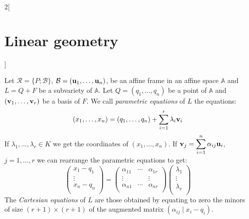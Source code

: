 \documentclass[../../../main.tex]{subfiles}
\begin{document}
\begin{multicols}{2}[\section{Linear geometry}]
\begin{definition}
  \end{definition}
  \begin{definition}
    Let $\mathcal{R}=\{P;\mathcal{B}\}$, $\mathcal{B}=(\boldsymbol{\mathrm{u}}_1,\ldots,\boldsymbol{\mathrm{u}}_n)$, be an affine frame in an affine space $\mathbb{A}$ and $L=Q+F$ be a subvariety of $\mathbb{A}$. Let $Q=(q_1,\ldots,q_n)$ be a point of $\mathbb{A}$ and $(\boldsymbol{\mathrm{v}}_1,\ldots,\boldsymbol{\mathrm{v}}_r)$ be a basis of $F$. We call \emph{parametric equations} of $L$ the equations: $$(x_1,\ldots,x_n)=(q_1,\ldots,q_n)+\sum_{i=1}^r\lambda_i\boldsymbol{\mathrm{v}}_i$$ If $\lambda_1,\ldots,\lambda_r\in K$ we get the coordinates of $(x_1,\ldots,x_n)$. If $\displaystyle \boldsymbol{\mathrm{v}}_j=\sum_{i=1}^n\alpha_{ij}\boldsymbol{\mathrm{u}}_i$, $j=1,\ldots,r$ we can rearrange the parametric equations to get: $$\begin{pmatrix}
        x_1-q_1 \\
        \vdots  \\
        x_n-q_n \\
      \end{pmatrix}=\begin{pmatrix}
        \alpha_{11} & \cdots & \alpha_{1r} \\
        \vdots      &        & \vdots      \\
        \alpha_{n1} & \cdots & \alpha_{nr} \\
      \end{pmatrix}\begin{pmatrix}
        \lambda_1 \\
        \vdots    \\
        \lambda_r \\
      \end{pmatrix}$$ The \emph{Cartesian equations} of $L$ are those obtained by equating to zero the minors of size $(r+1)\times(r+1)$ of the augmented matrix $\left(\alpha_{ij}\mid x_i-q_i\right)$.
  \end{definition}

\end{multicols}
\end{document}
